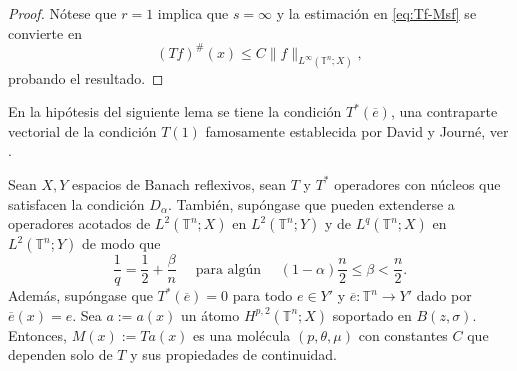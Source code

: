 \begin{proof}
	Nótese que $r=1$ implica que $s=\infty$ y la estimación en \cref{eq:Tf-Msf} se convierte en
	\begin{equation*}
		(Tf)^\#(x) \leq C\|f\|_{L^\infty(\mathbb{T}^n;X)},
	\end{equation*}
	probando el resultado.
\end{proof}
En la hipótesis del siguiente lema se tiene la condición $T^*(\overline{e})$, una contraparte vectorial de la condición $T(1)$ famosamente establecida por David y Journ\'e, ver \cite{david-journe}.
\begin{lemma}
	Sean $X, Y$ espacios de Banach reflexivos, sean $T$ y  $T^*$ operadores con núcleos que satisfacen la condición $D_\alpha$. También, supóngase que pueden extenderse a operadores acotados de $L^2(\mathbb{T}^n;X)$ en $L^2(\mathbb{T}^n;Y)$ y de $L^q(\mathbb{T}^n;X)$ en $L^2(\mathbb{T}^n;Y)$ de modo que 
	\begin{equation}
		\frac{1}{q} = \frac{1}{2} + \frac{\beta}{n} \quad \text{ para algún } \quad (1-\alpha)\frac{n}{2}\leq \beta<\frac{n}{2}.
	\end{equation}
	Además, supóngase que $T^*(\overline{e})=0$ para todo ${e}\in Y'$ y $\overline{e}:\mathbb{T}^n\rightarrow Y'$ dado por $\overline{e}(x)=e$. Sea $a:=a(x)$ un átomo $H^{p,2}(\mathbb{T}^n;X)$ soportado en $B(z,\sigma)$. Entonces, $M(x):=Ta(x)$ es una molécula $(p, \theta, \mu)$ con constantes $C$ que dependen solo de $T$ y sus propiedades de continuidad.
	\label{lem:Ta-is-molecule}
\end{lemma}

